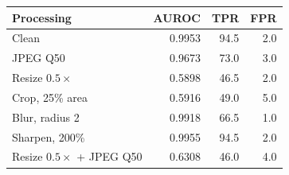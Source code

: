 \begin{tabular}{@{}lrrr@{}}
\toprule
Processing & AUROC & TPR & FPR \\
\midrule
Clean & 0.9953 & 94.5 & 2.0 \\
JPEG Q50 & 0.9673 & 73.0 & 3.0 \\
Resize $0.5\times$ & 0.5898 & 46.5 & 2.0 \\
Crop, 25\% area & 0.5916 & 49.0 & 5.0 \\
Blur, radius 2 & 0.9918 & 66.5 & 1.0 \\
Sharpen, 200\% & 0.9955 & 94.5 & 2.0 \\
Resize $0.5\times$ + JPEG Q50 & 0.6308 & 46.0 & 4.0 \\
\bottomrule
\end{tabular}
